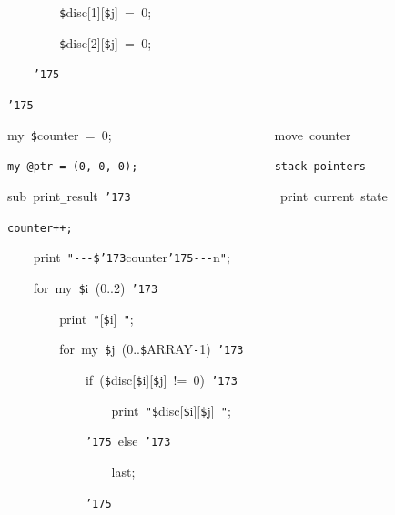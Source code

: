 \documentclass{article}
\begin{document}
\noindent
\mbox{}{\tt\mc \ \ \ \ \ \ \ \ }{\tt\$}disc[1][{\tt\$}j]{\tt\mc \ }={\tt\mc \ }0;

\noindent
\mbox{}{\tt\mc \ \ \ \ \ \ \ \ }{\tt\$}disc[2][{\tt\$}j]{\tt\mc \ }={\tt\mc \ }0;

\noindent
\mbox{}{\tt\mc \ \ \ \ }{\tt\char'175}

\noindent
\mbox{}{\tt\char'175}

\noindent
\mbox{}\hfill

\noindent
\mbox{}my{\tt\mc \ }{\tt\$}counter{\tt\mc \ }={\tt\mc \ }0;{\tt\mc \ \ \ \ \ \ \ \ \ \ \ \ \ \ \ \ \ \ \ \ \ \ \ \ }\rm\mc {\tt\#}\ move\ counter

\noindent
\mbox{}\tt\mc my{\tt\mc \ }@ptr{\tt\mc \ }={\tt\mc \ }(0,{\tt\mc \ }0,{\tt\mc \ }0);{\tt\mc \ \ \ \ \ \ \ \ \ \ \ \ \ \ \ \ \ \ \ \ }\rm\mc {\tt\#}\ stack\ pointers

\noindent
\mbox{}\tt\mc \hfill

\noindent
\mbox{}sub{\tt\mc \ }print{\tt\_}result{\tt\mc \ }{\tt\char'173}{\tt\mc \ \ \ \ \ \ \ \ \ \ \ \ \ \ \ \ \ \ \ \ \ \ }\rm\mc {\tt\#}\ print\ current\ state

\noindent
\mbox{}\tt\mc {\tt\mc \ \ \ \ }{\tt\$}counter++;

\noindent
\mbox{}{\tt\mc \ \ \ \ }print{\tt\mc \ }{\tt "}{\tt -}{\tt -}{\tt -}{\tt\$}{\tt\char'173}counter{\tt\char'175}{\tt -}{\tt -}{\tt -}{\tt{}}n{\tt "};

\noindent
\mbox{}{\tt\mc \ \ \ \ }for{\tt\mc \ }my{\tt\mc \ }{\tt\$}i{\tt\mc \ }(0..2){\tt\mc \ }{\tt\char'173}

\noindent
\mbox{}{\tt\mc \ \ \ \ \ \ \ \ }print{\tt\mc \ }{\tt "}[{\tt\$}i]{\tt\mc \ }{\tt "};

\noindent
\mbox{}{\tt\mc \ \ \ \ \ \ \ \ }for{\tt\mc \ }my{\tt\mc \ }{\tt\$}j{\tt\mc \ }(0..{\tt\$}ARRAY{\tt -}1){\tt\mc \ }{\tt\char'173}

\noindent
\mbox{}{\tt\mc \ \ \ \ \ \ \ \ \ \ \ \ }if{\tt\mc \ }({\tt\$}disc[{\tt\$}i][{\tt\$}j]{\tt\mc \ }!={\tt\mc \ }0){\tt\mc \ }{\tt\char'173}

\noindent
\mbox{}{\tt\mc \ \ \ \ \ \ \ \ \ \ \ \ \ \ \ \ }print{\tt\mc \ }{\tt "}{\tt\$}disc[{\tt\$}i][{\tt\$}j]{\tt\mc \ }{\tt "};

\noindent
\mbox{}{\tt\mc \ \ \ \ \ \ \ \ \ \ \ \ }{\tt\char'175}{\tt\mc \ }else{\tt\mc \ }{\tt\char'173}

\noindent
\mbox{}{\tt\mc \ \ \ \ \ \ \ \ \ \ \ \ \ \ \ \ }last;

\noindent
\mbox{}{\tt\mc \ \ \ \ \ \ \ \ \ \ \ \ }{\tt\char'175}
\end{document}
